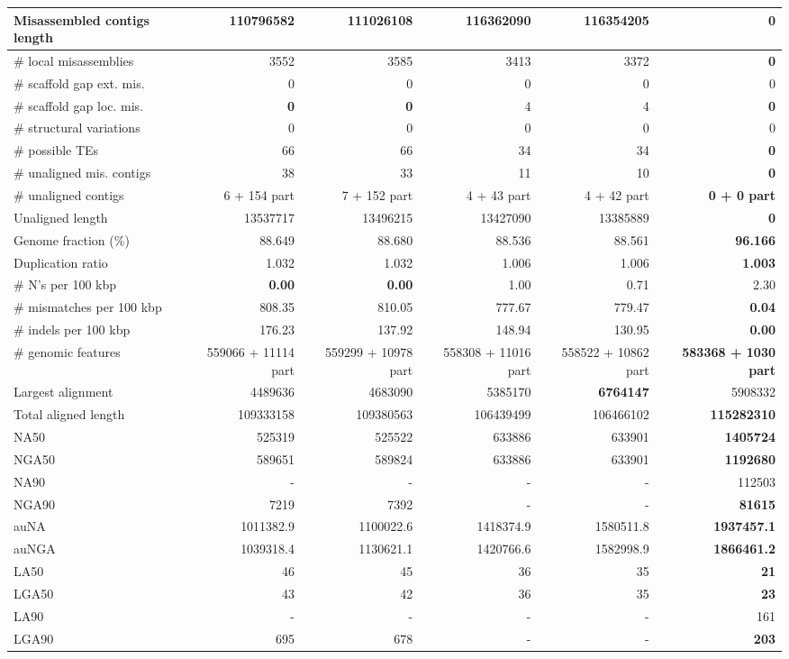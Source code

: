 \documentclass[12pt,a4paper]{article}
\begin{document}
\begin{table}[ht]
\begin{center}
\begin{tabular}{|l*{5}{|r}|}
Misassembled contigs length & 110796582 & 111026108 & 116362090 & 116354205 & {\bf 0} \\ \hline
\# local misassemblies & 3552 & 3585 & 3413 & 3372 & {\bf 0} \\ \hline
\# scaffold gap ext. mis. & 0 & 0 & 0 & 0 & 0 \\ \hline
\# scaffold gap loc. mis. & {\bf 0} & {\bf 0} & 4 & 4 & {\bf 0} \\ \hline
\# structural variations & 0 & 0 & 0 & 0 & 0 \\ \hline
\# possible TEs & 66 & 66 & 34 & 34 & {\bf 0} \\ \hline
\# unaligned mis. contigs & 38 & 33 & 11 & 10 & {\bf 0} \\ \hline
\# unaligned contigs & 6 + 154 part & 7 + 152 part & 4 + 43 part & 4 + 42 part & {\bf 0 + 0 part} \\ \hline
Unaligned length & 13537717 & 13496215 & 13427090 & 13385889 & {\bf 0} \\ \hline
Genome fraction (\%) & 88.649 & 88.680 & 88.536 & 88.561 & {\bf 96.166} \\ \hline
Duplication ratio & 1.032 & 1.032 & 1.006 & 1.006 & {\bf 1.003} \\ \hline
\# N's per 100 kbp & {\bf 0.00} & {\bf 0.00} & 1.00 & 0.71 & 2.30 \\ \hline
\# mismatches per 100 kbp & 808.35 & 810.05 & 777.67 & 779.47 & {\bf 0.04} \\ \hline
\# indels per 100 kbp & 176.23 & 137.92 & 148.94 & 130.95 & {\bf 0.00} \\ \hline
\# genomic features & 559066 + 11114 part & 559299 + 10978 part & 558308 + 11016 part & 558522 + 10862 part & {\bf 583368 + 1030 part} \\ \hline
Largest alignment & 4489636 & 4683090 & 5385170 & {\bf 6764147} & 5908332 \\ \hline
Total aligned length & 109333158 & 109380563 & 106439499 & 106466102 & {\bf 115282310} \\ \hline
NA50 & 525319 & 525522 & 633886 & 633901 & {\bf 1405724} \\ \hline
NGA50 & 589651 & 589824 & 633886 & 633901 & {\bf 1192680} \\ \hline
NA90 & - & - & - & - & 112503 \\ \hline
NGA90 & 7219 & 7392 & - & - & {\bf 81615} \\ \hline
auNA & 1011382.9 & 1100022.6 & 1418374.9 & 1580511.8 & {\bf 1937457.1} \\ \hline
auNGA & 1039318.4 & 1130621.1 & 1420766.6 & 1582998.9 & {\bf 1866461.2} \\ \hline
LA50 & 46 & 45 & 36 & 35 & {\bf 21} \\ \hline
LGA50 & 43 & 42 & 36 & 35 & {\bf 23} \\ \hline
LA90 & - & - & - & - & 161 \\ \hline
LGA90 & 695 & 678 & - & - & {\bf 203} \\ \hline
\end{tabular}
\end{center}
\end{table}
\end{document}
